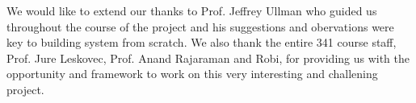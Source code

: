 We would like to extend our thanks to Prof. Jeffrey Ullman who guided us throughout the course of the project and his suggestions and obervations were key to building system from scratch. We also thank the entire 341 course staff, Prof. Jure Leskovec, Prof. Anand Rajaraman and Robi, for providing us with the opportunity and framework to work on this very interesting and challening project.
